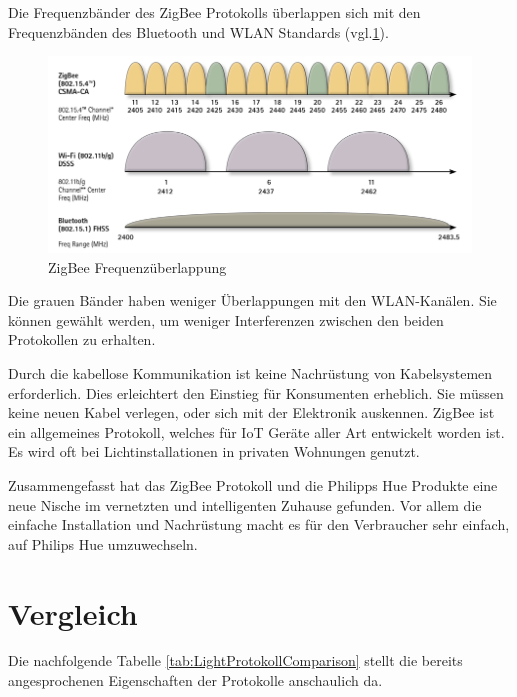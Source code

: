 Die Frequenzbänder des ZigBee Protokolls überlappen sich mit den Frequenzbänden des Bluetooth und WLAN Standards (vgl.\ref{fig:ZigBee_Frequency_bands}).
\begin{figure}[H]
	\centering
	\includegraphics[width=.8\linewidth]{Pictures/ZigBeeRfOverlap}
	\caption{ZigBee Frequenzüberlappung \cite[S.23]{GettingStartedWithZigBee}}
	\label{fig:ZigBee_Frequency_bands}
\end{figure}
Die grauen Bänder haben weniger Überlappungen mit den WLAN-Kanälen. Sie können gewählt werden, um weniger Interferenzen zwischen den beiden Protokollen zu erhalten.

Durch die kabellose Kommunikation ist keine Nachrüstung von Kabelsystemen erforderlich. Dies erleichtert den Einstieg für Konsumenten erheblich. Sie müssen keine neuen Kabel verlegen, oder sich mit der Elektronik auskennen. ZigBee ist ein allgemeines Protokoll, welches für IoT Geräte aller Art entwickelt worden ist. Es wird oft bei Lichtinstallationen in privaten Wohnungen genutzt.

Zusammengefasst hat das ZigBee Protokoll und die Philipps Hue Produkte eine neue Nische im vernetzten und intelligenten Zuhause gefunden. Vor allem die einfache Installation und Nachrüstung macht es für den Verbraucher sehr einfach, auf Philips Hue umzuwechseln.

\section{Vergleich}

Die nachfolgende Tabelle \ref{tab:LightProtokollComparison} stellt die bereits angesprochenen Eigenschaften der Protokolle anschaulich da.

\begin{table}[H]
	\centering
	\caption{Lichtsteuer Protokolle im Vergleich}
	\label{tab:LightProtokollComparison}
\end{table}

